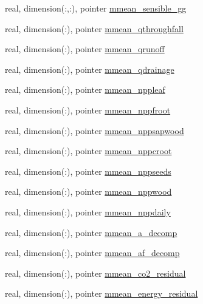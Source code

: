 \begin{DoxyCompactItemize}
\item 
real, dimension(\+:,\+:), pointer \hyperlink{structed__state__vars_1_1edtype_aff4dc9e825e0f9435a66f86feb81a518}{mmean\+\_\+sensible\+\_\+gg}
\item 
real, dimension(\+:), pointer \hyperlink{structed__state__vars_1_1edtype_a5cfb0dce0dd13fdd26c12e4db50cd2a8}{mmean\+\_\+qthroughfall}
\item 
real, dimension(\+:), pointer \hyperlink{structed__state__vars_1_1edtype_ad9b15fe7ec5f24232c2bcbc9812af3ac}{mmean\+\_\+qrunoff}
\item 
real, dimension(\+:), pointer \hyperlink{structed__state__vars_1_1edtype_a503da2e2c92822c8fc4f5de7830025fa}{mmean\+\_\+qdrainage}
\item 
real, dimension(\+:), pointer \hyperlink{structed__state__vars_1_1edtype_ab9cb93106c3e798f7f5cc32cae23b5f0}{mmean\+\_\+nppleaf}
\item 
real, dimension(\+:), pointer \hyperlink{structed__state__vars_1_1edtype_a88aa5298efbb67701e175150cd1d6b2c}{mmean\+\_\+nppfroot}
\item 
real, dimension(\+:), pointer \hyperlink{structed__state__vars_1_1edtype_a44dd429607b77e4323da4305886d6b8a}{mmean\+\_\+nppsapwood}
\item 
real, dimension(\+:), pointer \hyperlink{structed__state__vars_1_1edtype_a770db51048b9b378bbfffbe31bbc4862}{mmean\+\_\+nppcroot}
\item 
real, dimension(\+:), pointer \hyperlink{structed__state__vars_1_1edtype_a2813ec38e3336402c2015a2a75d32711}{mmean\+\_\+nppseeds}
\item 
real, dimension(\+:), pointer \hyperlink{structed__state__vars_1_1edtype_a0e2ac9cc5235c41bdc87614095bcbd10}{mmean\+\_\+nppwood}
\item 
real, dimension(\+:), pointer \hyperlink{structed__state__vars_1_1edtype_a11a4f1a5a660cb4d9df7bb329c21b597}{mmean\+\_\+nppdaily}
\item 
real, dimension(\+:), pointer \hyperlink{structed__state__vars_1_1edtype_ae5f9d98979bcb81d74240258e9d996fc}{mmean\+\_\+a\+\_\+decomp}
\item 
real, dimension(\+:), pointer \hyperlink{structed__state__vars_1_1edtype_a8ed1f2a9d1aa0599012cb2d78e72ff7e}{mmean\+\_\+af\+\_\+decomp}
\item 
real, dimension(\+:), pointer \hyperlink{structed__state__vars_1_1edtype_a91541adeb2c5f5b8f6a1ad3432d7fab3}{mmean\+\_\+co2\+\_\+residual}
\item 
real, dimension(\+:), pointer \hyperlink{structed__state__vars_1_1edtype_a0ede72c3fa205a32f3d5bcbfd643a867}{mmean\+\_\+energy\+\_\+residual}

\end{DoxyCompactItemize}
